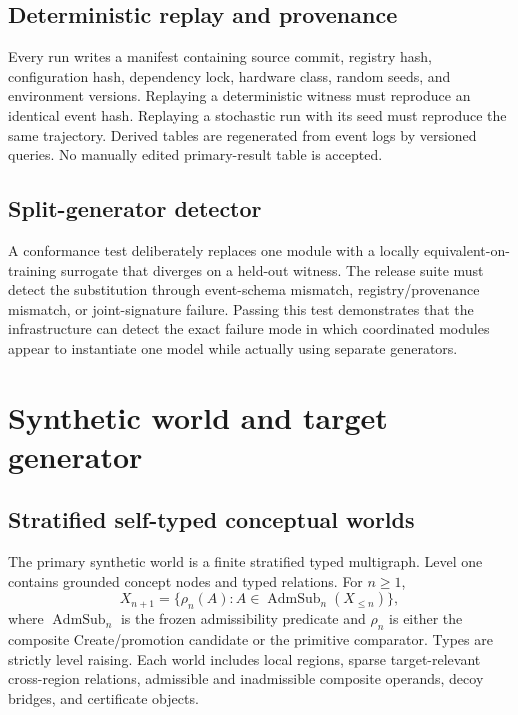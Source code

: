 \documentclass[11pt]{article}
\newcommand{\AdmSub}{\operatorname{AdmSub}}
\begin{document}
\subsection{Deterministic replay and provenance}

Every run writes a manifest containing source commit, registry hash, configuration hash, dependency lock, hardware class, random seeds, and environment versions. Replaying a deterministic witness must reproduce an identical event hash. Replaying a stochastic run with its seed must reproduce the same trajectory. Derived tables are regenerated from event logs by versioned queries. No manually edited primary-result table is accepted.

\subsection{Split-generator detector}

A conformance test deliberately replaces one module with a locally equivalent-on-training surrogate that diverges on a held-out witness. The release suite must detect the substitution through event-schema mismatch, registry/provenance mismatch, or joint-signature failure. Passing this test demonstrates that the infrastructure can detect the exact failure mode in which coordinated modules appear to instantiate one model while actually using separate generators.

\section{Synthetic world and target generator}

\subsection{Stratified self-typed conceptual worlds}

The primary synthetic world is a finite stratified typed multigraph. Level one contains grounded concept nodes and typed relations. For $n\ge1$,
\begin{equation}
X_{n+1}=\{\rho_n(A):A\in\AdmSub_n(X_{\le n})\},
\end{equation}
where $\AdmSub_n$ is the frozen admissibility predicate and $\rho_n$ is either the composite Create/promotion candidate or the primitive comparator. Types are strictly level raising. Each world includes local regions, sparse target-relevant cross-region relations, admissible and inadmissible composite operands, decoy bridges, and certificate objects.
\end{document}
